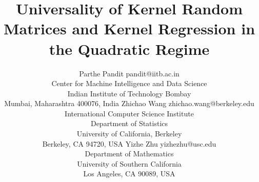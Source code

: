 \documentclass[twoside,11pt]{article}
\newcommand{\1}{\mathbf{1}}
\begin{document}
\title{Universality of Kernel Random Matrices and Kernel Regression in the Quadratic Regime}

\author{\name Parthe Pandit \email pandit@iitb.ac.in \\
       \addr Center for Machine Intelligence and Data Science\\
       Indian Institute of Technology Bombay\\
       Mumbai, Maharashtra 400076, India
       \AND
       \name Zhichao Wang \email zhichao.wang@berkeley.edu \\
       \addr International Computer Science Institute\\
       Department of Statistics\\
       University of California, Berkeley\\
       Berkeley, CA 94720, USA
       \AND
       \name Yizhe Zhu \email yizhezhu@usc.edu\\
       \addr Department of Mathematics\\
       University of Southern California\\
       Los Angeles, CA 90089, USA
}


\maketitle
\end{document}
